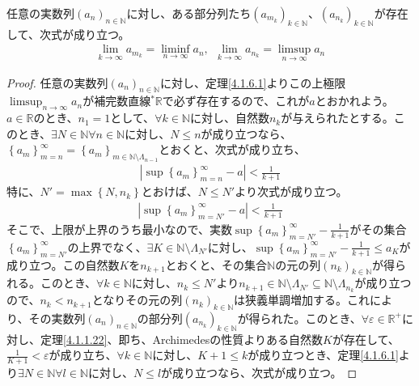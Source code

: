 \documentclass[dvipdfmx]{jsarticle}
\begin{document}
\begin{thm}\label{4.1.6.3}
任意の実数列$\left( a_{n} \right)_{n \in \mathbb{N}}$に対し、ある部分列たち$\left( a_{m_{k}} \right)_{k \in \mathbb{N}}$、$\left( a_{n_{k}} \right)_{k \in \mathbb{N}}$が存在して、次式が成り立つ。
\begin{align*}
\lim_{k \rightarrow \infty}a_{m_{k}} = \liminf_{n \rightarrow \infty}a_{n},\ \ \lim_{k \rightarrow \infty}a_{n_{k}} = \limsup_{n \rightarrow \infty}a_{n}
\end{align*}
\end{thm}
\begin{proof}
任意の実数列$\left( a_{n} \right)_{n \in \mathbb{N}}$に対し、定理\ref{4.1.6.1}よりこの上極限$\limsup_{n \rightarrow \infty}a_{n}$が補完数直線${}^{*}\mathbb{R}$で必ず存在するので、これが$a$とおかれよう。$a \in \mathbb{R}$のとき、$n_{1} = 1$として、$\forall k \in \mathbb{N}$に対し、自然数$n_{k}$が与えられたとする。このとき、$\exists N \in \mathbb{N}\forall n \in \mathbb{N}$に対し、$N \leq n$が成り立つなら、$\left\{ a_{m} \right\}_{m = n}^{\infty} = \left\{ a_{m} \right\}_{m \in \mathbb{N} \setminus \varLambda_{n - 1}}$とおくと、次式が成り立ち、
\begin{align*}
\left| \sup\left\{ a_{m} \right\}_{m = n}^{\infty} - a \right| < \frac{1}{k + 1}
\end{align*}
特に、$N' = \max\left\{ N,n_{k} \right\}$とおけば、$N \leq N'$より次式が成り立つ。
\begin{align*}
\left| \sup\left\{ a_{m} \right\}_{m = N'}^{\infty} - a \right| < \frac{1}{k + 1}
\end{align*}
そこで、上限が上界のうち最小なので、実数$\sup\left\{ a_{m} \right\}_{m = N'}^{\infty} - \frac{1}{k + 1}$がその集合$\left\{ a_{m} \right\}_{m = N'}^{\infty}$の上界でなく、$\exists K \in \mathbb{N} \setminus \varLambda_{N'}$に対し、$\sup\left\{ a_{m} \right\}_{m = N'}^{\infty} - \frac{1}{k + 1} \leq a_{K}$が成り立つ。この自然数$K$を$n_{k + 1}$とおくと、その集合$\mathbb{N}$の元の列$\left( n_{k} \right)_{k \in \mathbb{N}}$が得られる。このとき、$\forall k \in \mathbb{N}$に対し、$n_{k} \leq N'$より$n_{k + 1} \in \mathbb{N} \setminus \varLambda_{N'} \subseteq \mathbb{N} \setminus \varLambda_{n_{k}}$が成り立つので、$n_{k} < n_{k + 1}$となりその元の列$\left( n_{k} \right)_{k \in \mathbb{N}}$は狭義単調増加する。これにより、その実数列$\left( a_{n} \right)_{n \in \mathbb{N}}$の部分列$\left( a_{n_{k}} \right)_{k \in \mathbb{N}}$が得られた。このとき、$\forall\varepsilon \in \mathbb{R}^{+}$に対し、定理\ref{4.1.1.22}、即ち、Archimedesの性質よりある自然数$K$が存在して、$\frac{1}{K + 1} < \varepsilon$が成り立ち、$\forall k \in \mathbb{N}$に対し、$K + 1 \leq k$が成り立つとき、定理\ref{4.1.6.1}より$\exists N \in \mathbb{N}\forall l \in \mathbb{N}$に対し、$N \leq l$が成り立つなら、次式が成り立つ。

\end{proof}
\end{document}

